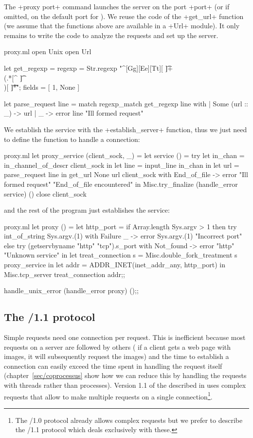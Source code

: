The \ml+proxy port+ command launches the server on the port \ml+port+
(or if omitted, on the default port for {\http}). We reuse the code of
the \ml+get_url+ function (we assume that the functions above are
available in a \ml+Url+ module). It only remains to write the code to
analyze the requests and set up the server.
%
\begin{listingcodefile}{proxy.ml}
open Unix
open Url

let get_regexp =
  { regexp = Str.regexp "^[Gg][Ee][Tt][ \t]+\\(.*[^ \t]\\)[ \t]*\r";
    fields = [ 1, None ] }

let parse_request line = match regexp_match get_regexp line with
  | Some (url :: _) -> url
  | _ -> error line "Ill formed request"
\end{listingcodefile}
%
We establish the service with the \ml+establish_server+
function, thus we just need to define the function to handle a 
connection:
%
\begin{listingcodefile}{proxy.ml}
let proxy_service (client_sock, _) =
  let service () =
    try
      let in_chan = in_channel_of_descr client_sock in
      let line = input_line in_chan in
      let url = parse_request line in
      get_url None url client_sock
    with End_of_file ->
      error "Ill formed request" "End_of_file encountered"
  in
  Misc.try_finalize
    (handle_error service) ()
    close client_sock
\end{listingcodefile}
\label{page/get_url}
%
and the rest of the program just establishes the service:
%
\begin{listingcodefile}{proxy.ml}
let proxy () =
  let http_port =
    if Array.length Sys.argv > 1 then
      try int_of_string Sys.argv.(1)
      with Failure _ -> error Sys.argv.(1) "Incorrect port"
    else
      try (getservbyname "http" "tcp").s_port
      with Not_found -> error "http" "Unknown service"
  in
  let treat_connection s = Misc.double_fork_treatment s proxy_service in
  let addr = ADDR_INET(inet_addr_any, http_port) in
  Misc.tcp_server treat_connection addr;;

handle_unix_error (handle_error proxy) ();;
\end{listingcodefile}

\subsection*{The {\normalfont \http/1.1} protocol}

Simple {\http} requests need one connection per request. This is
inefficient because most requests on a server are followed by others
(\eg{} if a client gets a web page with images, it will
subsequently request the images) and the time to establish a
connection can easily exceed the time spent in handling the request
itself (chapter~\ref{sec/coprocessus} show how we can reduce this by
handling the requests with threads rather than processes). Version 1.1
of the {\http} described in  uses complex requests that
allow to make multiple requests on a single connection\footnote{The \http/1.0
  protocol already  allows complex requests but we prefer to describe the 
  \http/1.1 protocol which deals exclusively with these.}. 


